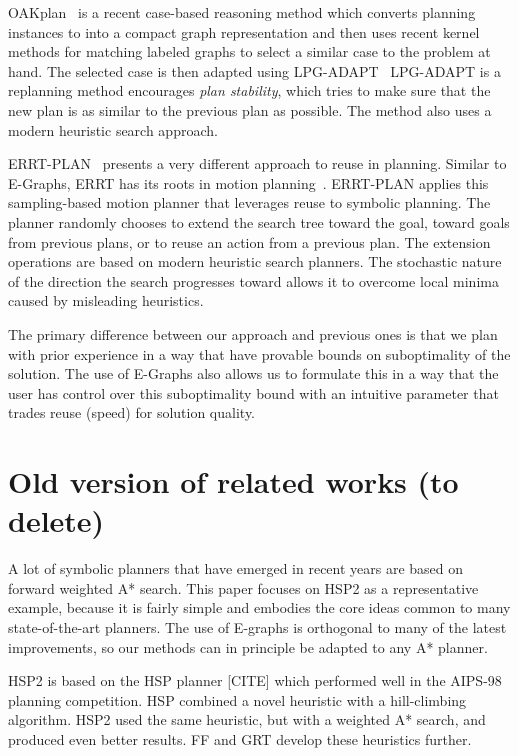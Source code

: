 \documentclass[letterpaper]{article}
\begin{document}
OAKplan~\cite{Serina:2010:KFC:1860143.1860472} is a recent 
case-based reasoning method which converts 
planning instances to into a compact graph representation and 
then uses recent kernel methods for matching labeled graphs to select
a similar case to the problem at hand. The selected case is then 
adapted using LPG-ADAPT~\cite{Fox06planstability} LPG-ADAPT is a replanning method 
encourages \textit{plan stability}, which tries to make 
sure that the new plan is as similar to the previous plan as possible. 
The method also uses a modern heuristic search approach.

ERRT-PLAN~\cite{workshop-icaps12-errtplan} presents a very different 
approach to reuse in planning. 
Similar to E-Graphs, ERRT has its roots in motion planning~\cite{Bruce:2002}.
ERRT-PLAN applies this sampling-based motion planner that leverages 
reuse to symbolic planning. The planner randomly chooses to extend 
the search tree toward the goal, toward goals from previous 
plans, or to reuse an action from a previous plan. 
The extension operations are based on modern heuristic search
planners.
The stochastic nature of the direction the search progresses toward
allows it to overcome local minima caused by misleading heuristics.

The primary difference between our approach and previous ones 
is that we plan with prior experience in a way that have provable
bounds on suboptimality of the solution. The use of E-Graphs also
allows us to formulate this in a way that the user has control over
this suboptimality bound with an intuitive parameter that trades
reuse (speed) for solution quality.

\section{Old version of related works (to delete)}

A lot of symbolic planners that have emerged in recent years are based on forward weighted A* search. This paper focuses on HSP2 as a representative example, because it is fairly simple and embodies the core ideas common to many state-of-the-art planners. The use of E-graphs is orthogonal to many of the latest improvements, so our methods can in principle be adapted to any A* planner.

HSP2 is based on the HSP planner [CITE] which performed well in the AIPS-98 planning competition. HSP combined a novel heuristic with a hill-climbing algorithm. HSP2 used the same heuristic, but with a weighted A* search, and produced even better results. FF and GRT develop these heuristics further.
\end{document}

